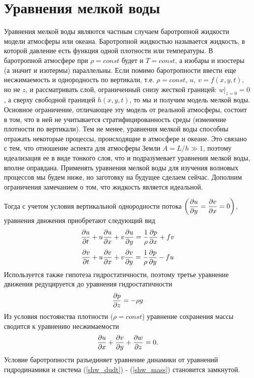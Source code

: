 \section{{\color{done}Уравнения мелкой воды}}
    Уравнения мелкой воды являются частным случаем баротропной жидкости модели атмосферы или океана. Баротропной жидкостью называется жидкость, в которой давление есть функция одной плотности или температуры. В баротропной атмосфере при $\rho=const$ будет и $T=const$, а изобары и изостеры (а значит и изотермы) параллельны. Если помимо баротропности ввести еще несжимаемость и однородность по вертикали, т.е. $\rho=const$, $u,\: v=f(x,y,t)$, но не $z$, и рассматривать слой, ограниченный снизу жесткой границей: $w|_{z=0}=0$, а сверху свободной границей $h(x,y,t)$, то мы и получим модель мелкой воды. Основное ограничение, отличающее эту модель от реальной атмосферы, состоит в том, что в ней не учитывается стратифицированность среды (изменение плотности по вертикали). Тем не менее, уравнения мелкой воды способны отражать некоторые процессы, происходящие в атмосфере и океане. Это связано с тем, что отношение аспекта для атмосферы Земли $A=L/h\gg1$, поэтому идеализация ее в виде тонкого слоя, что и подразумевает уравнения мелкой воды, вполне оправдана. Применять уравнения мелкой воды для изучения волновых процессов мы будем ниже, но заготовку на будущее сделаем сейчас. Дополним ограничения замечанием о том, что жидкость является идеальной. 

    Тогда с учетом условия вертикальной однородности потока $\left(\displaystyle\frac{\partial u}{\partial y}=\displaystyle\frac{\partial v}{\partial x}=0\right)$, уравнения движения приобретают следующий вид
    \begin{equation}
    \label{shw_dudt}
        \displaystyle\frac{\partial u}{\partial t} + u\displaystyle\frac{\partial u}{\partial x} + v\displaystyle\frac{\partial u}{\partial y} = \frac{1}{\rho} \displaystyle\frac{\partial p}{\partial x} + fv \\
    \end{equation} 
    \begin{equation}
    \label{shw_dvdt}
        \displaystyle\frac{\partial v}{\partial t} + u\displaystyle\frac{\partial v}{\partial x} + v\displaystyle\frac{\partial v}{\partial y} = \frac{1}{\rho} \displaystyle\frac{\partial p}{\partial y} - fu \\
    \end{equation} 
    Используется также гипотеза гидростатичности, поэтому третье уравнение движения редуцируется до уравнения гидростатичности
    \begin{equation}
    \label{shw_hydrostat}
        \displaystyle\frac{\partial p}{\partial z} = -\rho g \\
    \end{equation} 
    Из условия постоянства плотности ($\rho=const$) уравнение сохранения массы сводится к уравнению несжимаемости
    \begin{equation}
    \label{shw_mass}
        \displaystyle\frac{\partial u}{\partial x} + \displaystyle\frac{\partial v}{\partial y} + \displaystyle\frac{\partial w}{\partial z} = 0.
    \end{equation} 
    Условие баротропности разъединяет уравнение динамики от уравнений гидродинамики и система (\ref{shw_dudt}) - (\ref{shw_mass}) становится замкнутой. 


